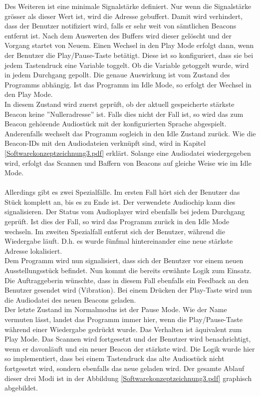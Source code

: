 Des Weiteren ist eine minimale Signalstärke definiert. Nur wenn die Signalstärke grösser als dieser Wert ist, wird die Adresse gebuffert. Damit wird verhindert, dass der Benutzer notifiziert wird, falls er sehr weit von sämtlichen Beacons entfernt ist.
Nach dem Auswerten des Buffers wird dieser gelöscht und der Vorgang startet von Neuem. Einen Wechsel in den Play Mode erfolgt dann, wenn der Benutzer die Play/Pause-Taste betätigt. Diese ist so konfiguriert, dass sie bei jedem Tastendruck eine Variable toggelt. Ob die Variable getoggelt wurde, wird in jedem Durchgang gepollt. Die genaue Auswirkung ist vom Zustand des Programms abhängig. Ist das Programm im Idle Mode, so erfolgt der Wechsel in den Play Mode.\\
In diesem Zustand wird zuerst geprüft, ob der aktuell gespeicherte stärkste Beacon keine ''Nulleradresse'' ist. Falls dies nicht der Fall ist, so wird das zum Beacon gehörende Audiostück mit der konfigurierten Sprache abgespielt. Anderenfalls wechselt das Programm sogleich in den Idle Zustand zurück. Wie die Beacon-IDs mit den Audiodateien verknüpft sind, wird in Kapitel \ref{Softwarekonzeptzeichnung3.pdf} erklärt.
Solange eine Audiodatei wiedergegeben wird, erfolgt das Scannen und Baffern von Beacons auf gleiche Weise wie im Idle Mode.\\\\
Allerdings gibt es zwei Spezialfälle. Im ersten Fall hört sich der Benutzer das Stück komplett an, bis es zu Ende ist. Der verwendete Audiochip kann dies signalisieren. Der Status vom Audioplayer wird ebenfalls bei jedem Durchgang geprüft. Ist dies der Fall, so wird das Programm zurück in den Idle Mode wechseln. Im zweiten Spezialfall entfernt sich der Benutzer, während die Wiedergabe läuft. D.h. es wurde fünfmal hintereinander eine neue stärkste Adresse lokalisiert.\\ Dem Programm wird nun signalisiert, dass sich der Benutzer vor einem neuen Ausstellungsstück befindet. Nun kommt die bereits erwähnte Logik zum Einsatz. Die Auftraggeberin wünschte, dass in diesem Fall ebenfalls ein Feedback an den Benutzer gesendet wird (Vibration). Bei einem Drücken der Play-Taste wird nun die Audiodatei des neuen Beacons geladen.\\
Der letzte Zustand im Normalmodus ist der Pause Mode. Wie der Name vermuten lässt, landet das Programm immer hier, wenn die Play/Pause-Taste während einer Wiedergabe gedrückt wurde. Das Verhalten ist äquivalent zum Play Mode. Das Scannen wird fortgesetzt und der Benutzer wird benachrichtigt, wenn er davonläuft und ein neuer Beacon der stärkste wird. Die Logik wurde hier so implementiert, dass bei einem Tastendruck das alte Audiostück nicht fortgesetzt wird, sondern ebenfalls das neue geladen wird. 
Der gesamte Ablauf dieser drei Modi ist in der Abbildung \ref{Softwarekonzeptzeichnung3.pdf} graphisch abgebildet.\\
 
